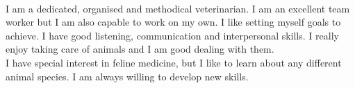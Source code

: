 \documentclass[a4paper,hidelinks]{catclinic_template}
\begin{document}
  \begin{cvSidebar}

    \begin{cvProfile}
    	\\[5pt]
      {
      \justifying%
       I am a dedicated, organised and methodical veterinarian. I am an excellent team worker but I am also capable to work on my own. I like setting myself goals to achieve. I have good listening, communication and interpersonal skills. I really enjoy taking care of animals and I am good dealing with them. \\

       I have special interest in feline medicine, but I like to learn about any different animal species. I am always willing to develop new skills.
       }
    	\\[5pt]
    \end{cvProfile}

    \begin{cvContact}
    \end{cvContact}

    \begin{cvLanguages}
    \\[3pt]
    \\[1pt]
    \end{cvLanguages}

    \begin{cvInterests}[short]
      \\[5pt]



\end{cvInterests}
\end{cvSidebar}
\end{document}
